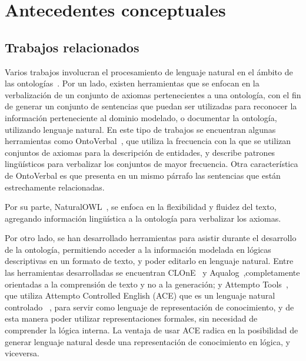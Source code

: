 \chapter{Antecedentes conceptuales}

\section{Trabajos relacionados}
Varios trabajos involucran el procesamiento de lenguaje natural en el ámbito de las ontologías~\cite{moreno2018ontologia}\cite{perez2002explotacion}\cite{vallez2009web}. Por un lado, existen herramientas que se enfocan en la verbalización de un conjunto de axiomas pertenecientes a una ontología, con el fin de generar un conjunto de sentencias que puedan ser utilizadas para reconocer la información perteneciente al dominio modelado, o documentar la ontología, utilizando lenguaje natural. En este tipo de trabajos se encuentran algunas herramientas como OntoVerbal~\cite{liang2013ontoverbal}, que utiliza la frecuencia con la que se utilizan conjuntos de axiomas para la descripción de entidades, y describe patrones lingüísticos para verbalizar los conjuntos de mayor frecuencia. Otra característica de OntoVerbal es que presenta en un mismo párrafo las sentencias que están estrechamente relacionadas. %

Por su parte, NaturalOWL~\cite{galanis2007generating}, se enfoca en la flexibilidad y fluidez del texto, agregando información lingüística a la ontología para verbalizar los axiomas.

Por otro lado, se han desarrollado herramientas para asistir durante el desarrollo de la ontología, permitiendo acceder a la información modelada en lógicas descriptivas en un formato de texto, y poder editarlo en lenguaje natural. Entre las herramientas desarrolladas se encuentran CLOnE~\cite{power2010complexity} y Aqualog~\cite{lopez2005aqualog},completamente orientadas a la comprensión de texto y no a la generación; y Attempto Tools~\cite{attempto}, que utiliza Attempto Controlled English  (ACE) que es un lenguaje natural controlado ~\cite{CNL}, para servir como lenguaje de representación de conocimiento, y de esta manera poder utilizar representaciones formales, sin necesidad de comprender la lógica interna. La ventaja de usar ACE radica en la posibilidad de generar lenguaje natural desde una representación de conocimiento en lógica, y viceversa.

